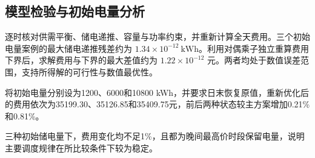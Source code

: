 \subsection{模型检验与初始电量分析}
逐时核对供需平衡、储电递推、容量与功率约束，并重新计算全天费用。三个初始电量案例的最大储电递推残差约为 $1.34\times10^{-12}\ \mathrm{kWh}$。利用对偶乘子独立重算费用下界后，求解费用与下界的最大差值约为 $1.22\times10^{-12}$ 元。两者均处于数值误差范围，支持所得解的可行性与数值最优性。

\begin{samepage}
将初始电量分别设为1200、6000和10800 kWh，并要求日末恢复原值，重新优化后的费用依次为35199.30、35126.85和35409.75元，前后两种状态较主方案增加0.21\%和0.81\%。
\par\end{samepage}

\begin{samepage}
三种初始储电量下，费用变化均不足1\%，且都为晚间最高价时段保留电量，说明主要调度规律在所比较条件下较为稳定。
\par\end{samepage}
